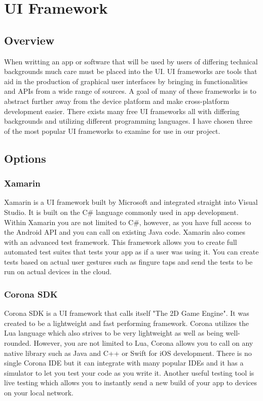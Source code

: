 \documentclass[onecolumn, draftclsnofoot,10pt, compsoc]{IEEEtran}
\begin{document}
\section{UI Framework}
	\subsection{Overview}
		When writting an app or software that will be used by users of differing technical backgrounds much care must be placed into the UI.
		UI frameworks are tools that aid in the production of graphical user interfaces by bringing in functionalities and APIs from a wide range of sources.
		A goal of many of these frameworks is to abstract further away from the device platform and make cross-platform development easier.
		There exists many free UI frameworks all with differing backgrounds and utilizing different programming languages.
		I have chosen three of the most popular UI frameworks to examine for use in our project.

	\subsection{Options}
		\subsubsection{Xamarin}
			Xamarin is a UI framework built by Microsoft and integrated straight into Visual Studio.
			It is built on the C\# language commonly used in app development.
			Within Xamarin you are not limited to C\#, however, as you have full access to the Android API and you can call on existing Java code\cite{xamarin_platform}.
			Xamarin also comes with an advanced test framework.
			This framework allows you to create full automated test suites that tests your app as if a user was using it.
			You can create tests based on actual user gestures such as fingure taps and send the tests to be run on actual devices in the cloud\cite{xamarin_test}.

		\subsubsection{Corona SDK}
			Corona SDK is a UI framework that calls itself "The 2D Game Engine".
			It was created to be a lightweight and fast performing framework.
			Corona utilizes the Lua language which also strives to be very lightweight as well as being well-rounded.
			However, you are not limited to Lua, Corona allows you to call on any native library such as Java and C++ or Swift for iOS development.
			There is no single Corona IDE but it can integrate with many popular IDEs and it has a simulator to let you test your code as you write it.
			Another useful testing tool is live testing which allows you to instantly send a new build of your app to devices on your local network\cite{corona_overview}.
\end{document}
